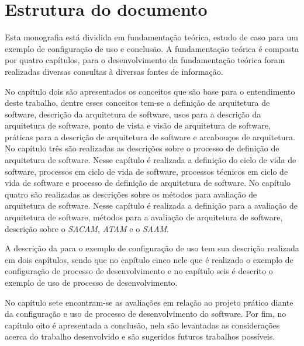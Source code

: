 \section{Estrutura do documento}

Esta monografia está dividida em fundamentação teórica, estudo de caso para um exemplo de configuração de uso e conclusão.
A fundamentação teórica é composta por quatro capítulos, para o desenvolvimento da fundamentação teórica foram realizadas diversas consultas à diversas fontes de informação.

No capítulo dois são apresentados os conceitos que são base para o entendimento deste trabalho, dentre esses conceitos tem-se a definição de arquitetura de software, descrição da arquitetura de software, usos para a descrição da arquitetura de software, ponto de vista e visão de arquitetura de software, práticas para a descrição de arquitetura de software e arcabouços de arquitetura.
No capítulo três são realizadas as descrições sobre o processo de definição de arquitetura de software. Nesse capítulo é realizada a definição do ciclo de vida de software, processos em ciclo de vida de software, processos técnicos em ciclo de vida de software e processo de definição de arquitetura de software.
No capítulo quatro são realizadas as descrições sobre os métodos para avaliação de arquitetura de software. Nesse capítulo é realizada a definição para a avaliação de arquitetura de software, métodos para a avaliação de arquitetura de software, descrição sobre o \emph{\acrfull{SACAM}}, \emph{\acrfull{ATAM}} e o \emph{\acrfull{SAAM}}. 

A descrição da para o exemplo de configuração de uso tem sua descrição realizada em dois capítulos, sendo que no capítulo cinco nele que é realizado o exemplo de configuração de processo de desenvolvimento e no capítulo seis é descrito o exemplo de uso de processo de desenvolvimento.

No capítulo sete encontram-se as avaliações em relação ao projeto prático diante da configuração e uso de processo de desenvolvimento do software. Por fim, no capítulo oito é apresentada a conclusão, nela são levantadas as considerações acerca do trabalho desenvolvido e são sugeridos futuros trabalhos possíveis.